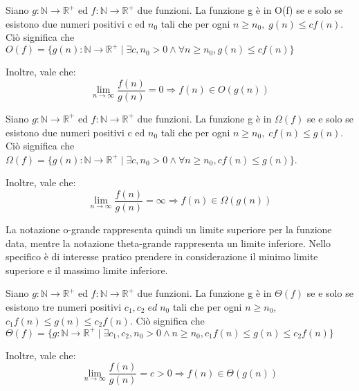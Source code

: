   \begin{definition}[Notazione O]
    Siano \(g:\mathbb{N}\to\mathbb{R}^+\) ed \(f:\mathbb{N}\to\mathbb{R}^+\) due funzioni. La funzione g è in O(f) se e solo se esistono due numeri positivi c ed \(n_0\) tali che per ogni \(n\ge n_0,\; g(n)\le cf(n)\). Ciò significa che \(O(f)=\{g(n):\mathbb{N}\to\mathbb{R}^+ \;|\; \exists c,n_0>0 \land \forall n\ge n_0, g(n)\le cf(n)\}\)

    Inoltre, vale che:
    \begin{equation*}
      \lim_{n\to \infty}\frac{f(n)}{g(n)}=0 \Rightarrow f(n)\in O(g(n))
    \end{equation*}
  \end{definition}

  \begin{definition}
    Siano \(g:\mathbb{N}\to\mathbb{R}^+\) ed \(f:\mathbb{N}\to\mathbb{R}^+\) due funzioni. La funzione g è in \(\Omega(f)\) se e solo se esistono due numeri positivi c ed \(n_0\) tali che per ogni \(n\ge n_0,\; cf(n)\le g(n)\). Ciò significa che \(\Omega(f)=\{g(n):\mathbb{N}\to\mathbb{R}^+ \;|\; \exists c,n_0>0 \land \forall n\ge n_0, cf(n)\le g(n)\}\).

    Inoltre, vale che:
    \begin{equation*}
      \lim_{n\to \infty}\frac{f(n)}{g(n)}=\infty \Rightarrow f(n)\in \Omega(g(n))
    \end{equation*}    
  \end{definition}  

  La notazione o-grande rappresenta quindi un limite superiore per la funzione data, mentre la notazione theta-grande rappresenta un limite inferiore. Nello specifico è di interesse pratico prendere in considerazione il minimo limite superiore e il massimo limite inferiore.

  \begin{definition}  \label{Theta}
    Siano \(g:\mathbb{N}\to\mathbb{R}^+\) ed \(f:\mathbb{N}\to\mathbb{R}^+\) due funzioni. La funzione g è in \(\Theta(f)\) se e solo se esistono tre numeri positivi \(c_1, c_2\;ed\; n_0\) tali che per ogni \(n \ge n_0\), \(c_1f(n)\le g(n)\le c_2f(n)\). Ciò significa che \(\Theta(f)=\{g:\mathbb{N}\to\mathbb{R}^+\;|\;\exists c_1,c_2,n_0>0 \land n\ge n_0, c_1f(n)\le g(n)\le c_2f(n)\}\)
    
    Inoltre, vale che:
    \begin{equation*}
      \lim_{n\to \infty}\frac{f(n)}{g(n)}=c>0 \Rightarrow f(n) \in \Theta(g(n))
    \end{equation*}
  \end{definition}

